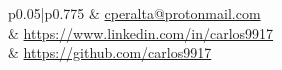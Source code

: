 \documentclass[10pt]{article} %
\begin{document}
\begin{paracol}{2}
	
	
	
	



\switchcolumn %


\parbox[top][0.12\textheight][c]{\linewidth}{ %
	\vspace{-0.04\textheight} %
	\colorbox{shade}{ %
		\begin{supertabular}{p{0.05\linewidth}|p{0.775\linewidth}} %
			\raisebox{0pt}{\small\faEnvelope} & \href{mailto:cperalta@protonmail.com}{cperalta@protonmail.com} \\ %
			\raisebox{-1pt}{\small\faDesktop} & \href{https://www.linkedin.com/in/carlos9917}{https://www.linkedin.com/in/carlos9917} \\ %
			\raisebox{-1pt}{\faGithub} & \href{https://github.com/carlos9917}{https://github.com/carlos9917} \\ %
		\end{supertabular}
	}
}


\end{paracol}
\end{document}
